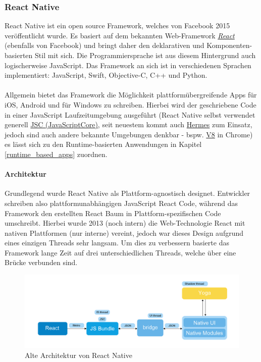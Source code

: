 \subsubsection{React Native}
\label{react-native}
React Native ist ein open source Framework, welches von Facebook 2015 veröffentlicht wurde. 
Es basiert auf dem bekannten Web-Framework \href{https://reactjs.org/}{\textit{React}} (ebenfalls von Facebook) und bringt daher den deklarativen und Komponenten-basierten Stil mit sich. 
Die Programmiersprache ist aus diesem Hintergrund auch logischerweise JavaScript.
Das Framework an sich ist in verschiedenen Sprachen implementiert: JavaScript, Swift, Objective-C, C++ und Python.\\
\\
Allgemein bietet das Framework die Möglichkeit plattformübergreifende Apps für iOS, Android und für Windows zu schreiben. Hierbei wird der geschriebene Code in einer JavaScript Laufzeitumgebung ausgeführt (React Native selbst verwendet generell \href{https://trac.webkit.org/wiki/JavaScriptCore}{JSC (JavaScriptCore)}, seit neuestem kommt auch \href{https://hermesengine.dev/}{Hermes} zum Einsatz, jedoch sind auch andere bekannte Umgebungen denkbar - bspw. \href{https://v8.dev/}{V8} in Chrome) es lässt sich zu den Runtime-basierten Anwendungen in Kapitel \ref{runtime_based_apps} zuordnen. \cite{reactnative2021}\\
\paragraph{Architektur}
Grundlegend wurde React Native als Plattform-agnostisch designet. Entwickler schreiben also plattformunabhängigen JavaScript React Code, während das Framework den erstellten React Baum in Plattform-spezifischen Code umschreibt. Hierbei wurde 2013 (noch intern) die Web-Technologie React mit nativen Plattformen (nur interne) vereint, jedoch war dieses Design aufgrund eines einzigen Threads sehr langsam. Um dies zu verbessern basierte das Framework lange Zeit auf drei unterschiedlichen Threads, welche über eine Brücke verbunden sind.

\begin{figure}[h]
	\begin{center}
		\includegraphics[scale=0.4]{images/reactnative_architecture_old.png}
	\end{center}
	\caption{Alte Architektur von React Native \protect \footnotemark}
	\label{fig:reactnative_architecture_old}
\end{figure}

